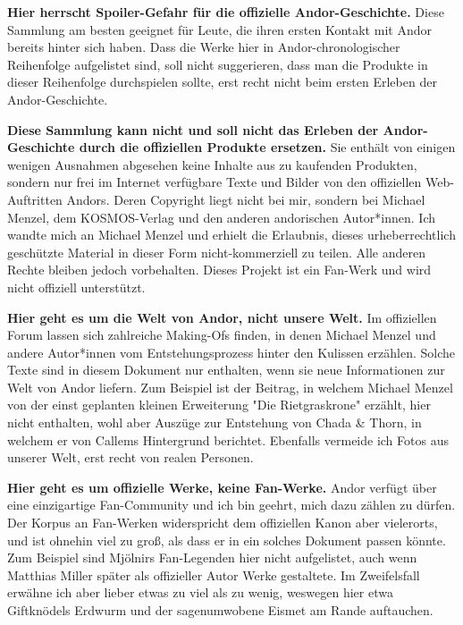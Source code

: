 \documentclass[10pt, a4paper, oneside]{book}
\newcommand{\fillbreak}{\vspace*{\fill}\columnbreak}
\begin{document}
\begin{multicols}{2}
\textbf{Hier herrscht Spoiler-Gefahr für die offizielle Andor-Geschichte.} Diese Sammlung am besten geeignet für Leute, die ihren ersten Kontakt mit Andor bereits hinter sich haben. Dass die Werke hier in Andor-chronologischer Reihenfolge aufgelistet sind, soll nicht suggerieren, dass man die Produkte in dieser Reihenfolge durchspielen sollte, erst recht nicht beim ersten Erleben der Andor-Geschichte.\bigskip

\fillbreak

\textbf{Diese Sammlung kann nicht und soll nicht das Erleben der Andor-Geschichte durch die offiziellen Produkte ersetzen.} Sie enthält von einigen wenigen Ausnahmen abgesehen keine Inhalte aus zu kaufenden Produkten, sondern nur frei im Internet verfügbare Texte und Bilder von den offiziellen Web-Auftritten Andors. Deren Copyright liegt nicht bei mir, sondern bei Michael Menzel, dem KOSMOS-Verlag und den anderen andorischen Autor*innen. Ich wandte mich an Michael Menzel und erhielt die Erlaubnis, dieses urheberrechtlich geschützte Material in dieser Form nicht-kommerziell zu teilen. Alle anderen Rechte bleiben jedoch vorbehalten. Dieses Projekt ist ein Fan-Werk und wird nicht offiziell unterstützt.\bigskip

\textbf{Hier geht es um die Welt von Andor, nicht unsere Welt.} Im offiziellen Forum lassen sich zahlreiche Making-Ofs finden, in denen Michael Menzel und andere Autor*innen vom Entstehungsprozess hinter den Kulissen erzählen. Solche Texte sind in diesem Dokument nur enthalten, wenn sie neue Informationen zur Welt von Andor liefern. Zum Beispiel ist der Beitrag, in welchem Michael Menzel von der einst geplanten kleinen Erweiterung "Die Rietgraskrone" erzählt, hier nicht enthalten, wohl aber Auszüge zur Entstehung von Chada \& Thorn, in welchem er von Callems Hintergrund berichtet. Ebenfalls vermeide ich Fotos aus unserer Welt, erst recht von realen Personen.\bigskip

\textbf{Hier geht es um offizielle Werke, keine Fan-Werke.} Andor verfügt über eine einzigartige Fan-Community und ich bin geehrt, mich dazu zählen zu dürfen. Der Korpus an Fan-Werken widerspricht dem offiziellen Kanon aber vielerorts, und ist ohnehin viel zu groß, als dass er in ein solches Dokument passen könnte. Zum Beispiel sind Mjölnirs Fan-Legenden hier nicht aufgelistet, auch wenn Matthias Miller später als offizieller Autor Werke gestaltete. Im Zweifelsfall erwähne ich aber lieber etwas zu viel als zu wenig, weswegen hier etwa Giftknödels Erdwurm und der sagenumwobene Eismet am Rande auftauchen.\bigskip


\end{multicols}
\end{document}
